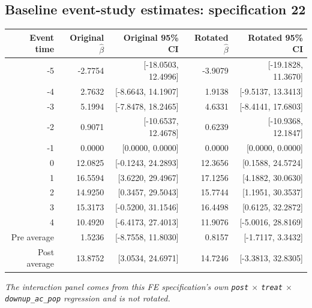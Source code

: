 \documentclass[10pt]{article}
\begin{document}
\subsection*{Baseline event-study estimates: specification 22}
\begin{center}
\scriptsize
\begin{tabular}{r rr rr}
\toprule
Event time & Original $\hat\beta$ & Original 95\% CI & Rotated $\hat\beta$ & Rotated 95\% CI \\
\midrule
-5 & -2.7754 & [-18.0503, 12.4996] & -3.9079 & [-19.1828, 11.3670] \\
-4 & 2.7632 & [-8.6643, 14.1907] & 1.9138 & [-9.5137, 13.3413] \\
-3 & 5.1994 & [-7.8478, 18.2465] & 4.6331 & [-8.4141, 17.6803] \\
-2 & 0.9071 & [-10.6537, 12.4678] & 0.6239 & [-10.9368, 12.1847] \\
-1 & 0.0000 & [0.0000, 0.0000] & 0.0000 & [0.0000, 0.0000] \\
0 & 12.0825 & [-0.1243, 24.2893] & 12.3656 & [0.1588, 24.5724] \\
1 & 16.5594 & [3.6220, 29.4967] & 17.1256 & [4.1882, 30.0630] \\
2 & 14.9250 & [0.3457, 29.5043] & 15.7744 & [1.1951, 30.3537] \\
3 & 15.3173 & [-0.5200, 31.1546] & 16.4498 & [0.6125, 32.2872] \\
4 & 10.4920 & [-6.4173, 27.4013] & 11.9076 & [-5.0016, 28.8169] \\
\midrule
Pre average & 1.5236 & [-8.7558, 11.8030] & 0.8157 & [-1.7117, 3.3432] \\
Post average & 13.8752 & [3.0534, 24.6971] & 14.7246 & [-3.3813, 32.8305] \\
\bottomrule
\end{tabular}
\end{center}
\medskip
\textit{The interaction panel comes from this FE specification's own \texttt{post} $\times$ \texttt{treat} $\times$ \texttt{downup\_ac\_pop} regression and is not rotated.}
\clearpage
\end{document}

